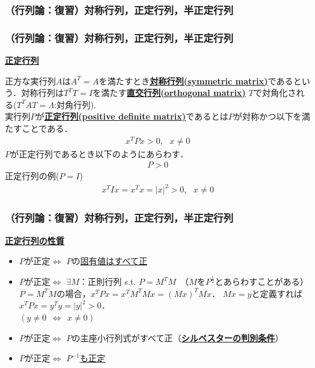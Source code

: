 \begin{frame}[t]
\frametitle{（行列論：復習）対称行列，正定行列，半正定行列}

\subsubsection{（行列論：復習）対称行列，正定行列，半正定行列}
\noindent
{\bf \underline{正定行列}}

正方な実行列$A$は$A^T=A$を満たすとき{\bf \underline{対称行列(symmetric matrix)}}であるという．対称行列は$T^T T=I$を満たす{\bf \underline{直交行列(orthogonal matrix)}} $T$で対角化される($T^T A T = \Lambda$:対角行列).
\\[3mm]

実行列$P$が{\bf \underline{正定行列(positive definite matrix)}}であるとは$P$が対称かつ以下を満たすことである．
\begin{eqnarray}
	x^T P x > 0, \ \ \ x \neq 0
\end{eqnarray}
$P$が正定行列であるとき以下のようにあらわす．
\begin{eqnarray}
	P>0
\end{eqnarray}
正定行列の例($ P = I $)
\begin{eqnarray}
	x^T I x = x^T x = \vert x \vert^2 > 0, \ \ \ x \neq 0
\end{eqnarray}
\end{frame}

\begin{frame}[t]
\frametitle{（行列論：復習）対称行列，正定行列，半正定行列}

\noindent
{\bf \underline{正定行列の性質}}
\begin{itemize}
  \item $P$が正定$\Leftrightarrow$ $P$の{\underline{固有値はすべて正}}
  \item $P$が正定$\Leftrightarrow$ $\exists M$：正則行列 s.t. {\bf \underline{$P = M^T M$}}　（$M$を$P^{\frac{1}{2}}$とあらわすことがある）\\
  	$P=M^TM$の場合，$x^T P x = x^T M^T M x = (Mx)^T Mx $．
  	$Mx=y$と定義すれば$x^T P x = y^T y = \vert y \vert^2>0$．\\
  	$(y \neq 0 \ \ \Leftrightarrow \ \ x \neq 0)$
  \item $P$が正定$\Leftrightarrow$ $P$の主座小行列式がすべて正（{\bf \underline{シルベスターの判別条件}}）
  \item $P$が正定$\Leftrightarrow$ {\underline{$P^{-1}$も正定}}
\end{itemize}
\end{frame}


